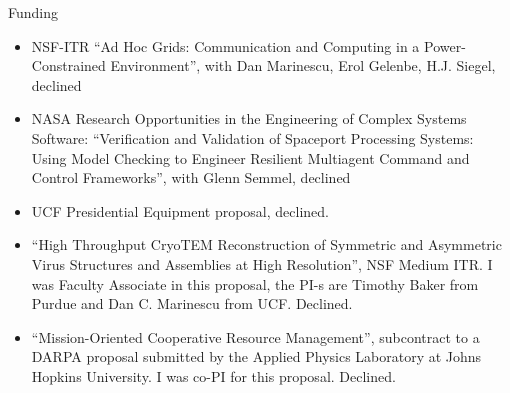 \begin{category}{Funding}
\begin{itemize}
\item NSF-ITR ``Ad Hoc Grids: Communication and Computing in a Power-Constrained
Environment'', with Dan Marinescu, Erol Gelenbe, H.J. Siegel, declined
\item NASA Research Opportunities in the Engineering of Complex Systems
Software: ``Verification and Validation of Spaceport Processing Systems: Using
Model Checking to Engineer Resilient Multiagent Command and Control
Frameworks'',
with Glenn Semmel, declined
\item UCF Presidential Equipment proposal, declined.
\item ``High Throughput
CryoTEM  Reconstruction of Symmetric and Asymmetric Virus Structures and
Assemblies at High Resolution'', NSF Medium ITR. I was Faculty Associate in this
proposal, the PI-s are Timothy Baker from Purdue and Dan C. Marinescu from UCF.
Declined.
\item ``Mission-Oriented Cooperative Resource Management'', subcontract to a
DARPA proposal submitted by the Applied Physics Laboratory at Johns Hopkins
University. I was co-PI for this proposal. Declined.
\end{itemize}

\end{category}